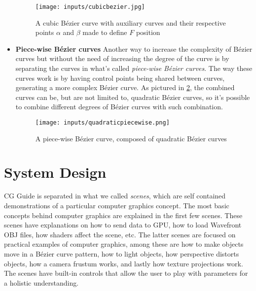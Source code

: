 \documentclass[cic,tc,english]{iiufrgs}
\begin{document}
\begin{itemize}
\begin{figure}[h!]
    \caption{A cubic Bézier curve with auxiliary curves and their respective points $\alpha$ and $\beta$ made to define $F$ position}
    \begin{center}
        \texttt{[image: inputs/cubicbezier.jpg]}
    \end{center}
    \label{cubicbezier}
\end{figure}

\item \textbf{Piece-wise Bézier curves}
Another way to increase the complexity of Bézier curves but without the need of increasing the degree of the curve is by separating the curves in what's called \textit{piece-wise Bézier curves}. The way these curves work is by having control points being shared between curves, generating a more complex Bézier curve. As pictured in \cref{piecewisebezier}, the combined curves can be, but are not limited to, quadratic Bézier curves, so it's possible to combine different degrees of Bézier curves with such combination.

\begin{figure}[h!]
    \caption{A piece-wise Bézier curve, composed of quadratic Bézier curves}
    \begin{center}
        \texttt{[image: inputs/quadraticpiecewise.png]}
    \end{center}
    \label{piecewisebezier}
\end{figure}

\end{itemize}





\chapter{System Design}
CG Guide is separated in what we called \textit{scenes}, which are self contained demonstrations of a particular computer graphics concept. The most basic concepts behind computer graphics are explained in the first few scenes. These scenes have explanations on how to send data to GPU, how to load Wavefront OBJ files, how shaders affect the scene, etc. The latter scenes are focused on practical examples of computer graphics, among these are how to make objects move in a Bézier curve pattern, how to light objects, how perspective distorts objects, how a camera frustum works, and lastly how texture projections work. The scenes have built-in controls that allow the user to play with parameters for a holistic understanding.
\end{document}
